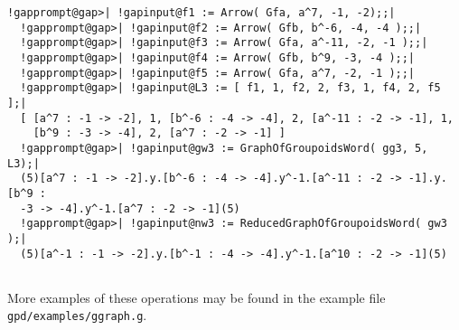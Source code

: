 \documentclass[a4paper,11pt]{report}
\begin{document}
{{\begin{Verbatim}[commandchars=!@|,fontsize=\small,frame=single,label=Example]
  !gapprompt@gap>| !gapinput@f1 := Arrow( Gfa, a^7, -1, -2);;|
  !gapprompt@gap>| !gapinput@f2 := Arrow( Gfb, b^-6, -4, -4 );;|
  !gapprompt@gap>| !gapinput@f3 := Arrow( Gfa, a^-11, -2, -1 );;|
  !gapprompt@gap>| !gapinput@f4 := Arrow( Gfb, b^9, -3, -4 );;|
  !gapprompt@gap>| !gapinput@f5 := Arrow( Gfa, a^7, -2, -1 );;|
  !gapprompt@gap>| !gapinput@L3 := [ f1, 1, f2, 2, f3, 1, f4, 2, f5 ];|
  [ [a^7 : -1 -> -2], 1, [b^-6 : -4 -> -4], 2, [a^-11 : -2 -> -1], 1, 
    [b^9 : -3 -> -4], 2, [a^7 : -2 -> -1] ]
  !gapprompt@gap>| !gapinput@gw3 := GraphOfGroupoidsWord( gg3, 5, L3);|
  (5)[a^7 : -1 -> -2].y.[b^-6 : -4 -> -4].y^-1.[a^-11 : -2 -> -1].y.[b^9 : 
  -3 -> -4].y^-1.[a^7 : -2 -> -1](5)
  !gapprompt@gap>| !gapinput@nw3 := ReducedGraphOfGroupoidsWord( gw3 );|
  (5)[a^-1 : -1 -> -2].y.[b^-1 : -4 -> -4].y^-1.[a^10 : -2 -> -1](5)
  
\end{Verbatim}
 }

 More examples of these operations may be found in the example file \texttt{gpd/examples/ggraph.g}. }

          
\end{document}
